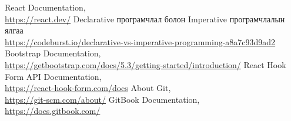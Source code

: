 \singlespace
{}
\begin{thebibliography}{}
	React Documentation,
   \\\url{https://react.dev/}
	Declarative програмчлал болон Imperative програмчлалын ялгаа
   \\\url{https://codeburst.io/declarative-vs-imperative-programming-a8a7c93d9ad2}
	Bootstrap Documentation,
   \\\url{https://getbootstrap.com/docs/5.3/getting-started/introduction/}
	React Hook Form API Documentation,
   \\\url{https://react-hook-form.com/docs}
	About Git,
   \\\url{https://git-scm.com/about/}
	GitBook Documentation,
   \\\url{https://docs.gitbook.com/}

\end{thebibliography}